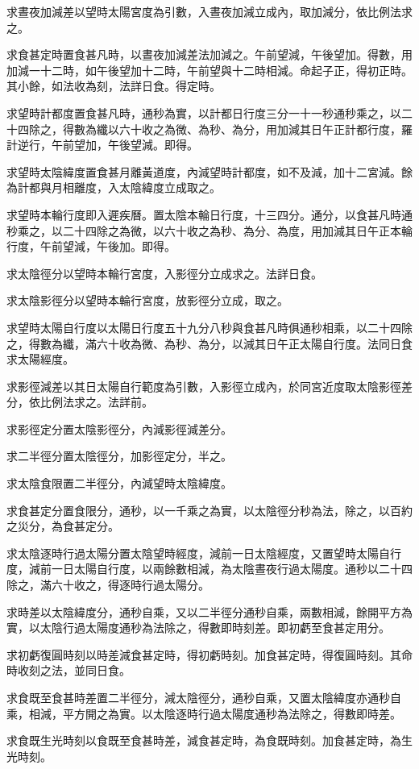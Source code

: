 求晝夜加減差以望時太陽宮度為引數，入晝夜加減立成內，取加減分，依比例法求之。

求食甚定時置食甚凡時，以晝夜加減差法加減之。午前望減，午後望加。得數，用加減一十二時，如午後望加十二時，午前望與十二時相減。命起子正，得初正時。其小餘，如法收為刻，法詳日食。得定時。

求望時計都度置食甚凡時，通秒為實，以計都日行度三分一十一秒通秒乘之，以二十四除之，得數為纖以六十收之為微、為秒、為分，用加減其日午正計都行度，羅計逆行，午前望加，午後望減。即得。

求望時太陰緯度置食甚月離黃道度，內減望時計都度，如不及減，加十二宮減。餘為計都與月相離度，入太陰緯度立成取之。

求望時本輪行度即入遲疾曆。置太陰本輪日行度，十三四分。通分，以食甚凡時通秒乘之，以二十四除之為微，以六十收之為秒、為分、為度，用加減其日午正本輪行度，午前望減，午後加。即得。

求太陰徑分以望時本輪行宮度，入影徑分立成求之。法詳日食。

求太陰影徑分以望時本輪行宮度，放影徑分立成，取之。

求望時太陽自行度以太陽日行度五十九分八秒與食甚凡時俱通秒相乘，以二十四除之，得數為纖，滿六十收為微、為秒、為分，以減其日午正太陽自行度。法同日食求太陽經度。

求影徑減差以其日太陽自行範度為引數，入影徑立成內，於同宮近度取太陰影徑差分，依比例法求之。法詳前。

求影徑定分置太陰影徑分，內減影徑減差分。

求二半徑分置太陰徑分，加影徑定分，半之。

求太陰食限置二半徑分，內減望時太陰緯度。

求食甚定分置食限分，通秒，以一千乘之為實，以太陰徑分秒為法，除之，以百約之災分，為食甚定分。

求太陰逐時行過太陽分置太陰望時經度，減前一日太陰經度，又置望時太陽自行度，減前一日太陽自行度，以兩餘數相減，為太陰晝夜行過太陽度。通秒以二十四除之，滿六十收之，得逐時行過太陽分。

求時差以太陰緯度分，通秒自乘，又以二半徑分通秒自乘，兩數相減，餘開平方為實，以太陰行過太陽度通秒為法除之，得數即時刻差。即初虧至食甚定用分。

求初虧復圓時刻以時差減食甚定時，得初虧時刻。加食甚定時，得復圓時刻。其命時收刻之法，並同日食。

求食既至食甚時差置二半徑分，減太陰徑分，通秒自乘，又置太陰緯度亦通秒自乘，相減，平方開之為實。以太陰逐時行過太陽度通秒為法除之，得數即時差。

求食既生光時刻以食既至食甚時差，減食甚定時，為食既時刻。加食甚定時，為生光時刻。


